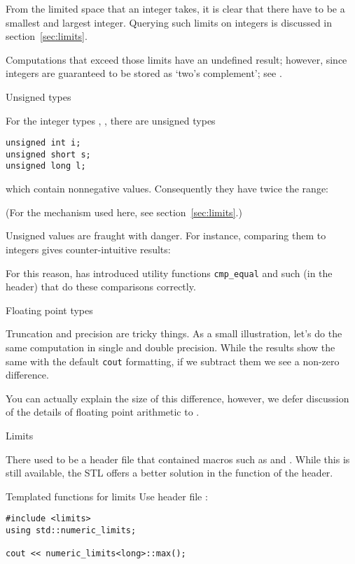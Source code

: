 From the limited space that an integer takes, it is clear
that there have to be a smallest and largest integer.
Querying such limits on integers is discussed in section~\ref{sec:limits}.

Computations that exceed those limits have an undefined result;
however, since  integers are guaranteed to be stored as
`two's complement'; see .

 {Unsigned types}
\label{sec:unsigned-cmp}

For the integer types , , 
there are unsigned types
\begin{lstlisting}
unsigned int i;
unsigned short s;
unsigned long l;
\end{lstlisting}
which contain nonnegative values.
Consequently they have twice the range:
%

(For the mechanism used here, see section~\ref{sec:limits}.)

Unsigned values are fraught with danger. For instance,
comparing them to integers gives counter-intuitive results:
%

For this reason,  has introduced utility functions
\lstinline+cmp_equal+ and such (in the  header)
that do these comparisons correctly.

 {Floating point types}

Truncation and precision are tricky things.
As a small illustration, let's do the same computation
in single and double precision.
While the results show the same with the default \lstinline{cout}
formatting,
if we subtract them we see a non-zero difference.


You can actually explain the size of this difference,
however, we defer discussion of the details
of floating point arithmetic to
.

 {Limits}
\label{sec:limits}

There used to be a header file  that contained
macros such as  and .
While this is still available,
the \ac{STL} offers a better solution in the
 function
of the  header.

\begin{block}{Templated functions for limits}
  \label{sl:stl-limits}
  Use header file :
\begin{lstlisting}
#include <limits>
using std::numeric_limits;

cout << numeric_limits<long>::max();
\end{lstlisting}
\end{block}

